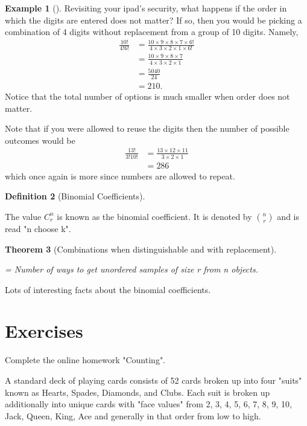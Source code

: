 \documentclass[10pt,]{book}
\theoremstyle{plain}
\newtheorem{theorem}{Theorem}[section]
\theoremstyle{definition}
\newtheorem{definition}[theorem]{Definition}
\theoremstyle{definition}
\newtheorem{example}[theorem]{Example}
\theoremstyle{definition}
\numberwithin{equation}{section}
\begin{document}
\begin{example}[]\label{example-10}
Revisiting your ipad's security, what happens if the order in which the digits are entered does not matter? If so, then you would be picking a combination of 4 digits without replacement from a group of 10 digits. Namely, 
		\begin{align*}
\frac{10!}{4!6!} & = \frac{10 \times 9 \times 8 \times 7 \times 6!}{4 \times 3 \times 2 \times 1 \times 6!}\\
& = \frac{10 \times 9 \times 8 \times 7}{4 \times 3 \times 2 \times 1}\\
& = \frac{5040}{24}\\
& = 210.
\end{align*}
		Notice that the total number of options is much smaller when order does not matter.
\par

		Note that if you were allowed to reuse the digits then the number of possible outcomes would be
		\begin{align*}
\frac{13!}{3!10!} & = \frac{13 \times 12 \times 11}{3 \times 2 \times 1} \\
 & = 286
\end{align*}
		which once again is more since numbers are allowed to repeat.
\end{example}
\begin{definition}[{Binomial Coefficients}]\label{definition-19}

		The value \(C_r^n\) is known as the binomial coefficient. It is
		denoted by \({n \choose r}\) and is read "n choose k".
\end{definition}
\begin{theorem}[{Combinations when distinguishable and with replacement}]\label{theorem-16}

	= Number of ways to get unordered samples of size r from n objects. 
	\end{theorem}
\par
Lots of interesting facts about the binomial coefficients.%
\typeout{************************************************}
\typeout{************************************************}
\section[{Exercises}]{Exercises}\label{section-16}
Complete the online homework "Counting".%
\par

A standard deck of playing cards consists of 52 cards broken up into four "suits" known as Hearts, Spades, Diamonds, and Clubs. Each suit is broken up additionally into unique cards with "face values" from {2, 3, 4, 5, 6, 7, 8, 9, 10, Jack, Queen, King, Ace} and generally in that order from low to high.%
\par
\end{document}
